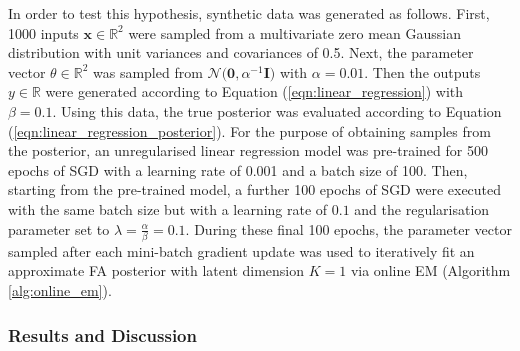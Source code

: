 \documentclass[msc,deptreport.inf]{infthesis} %
\newcommand{\matr}[1]{\mathbf{#1}}
\newcommand{\R}{\mathbb R}
\begin{document}
In order to test this hypothesis, synthetic data was generated as follows. First, 1000 inputs $\matr{x} \in \R^2$ were sampled from a multivariate zero mean Gaussian distribution with unit variances and covariances of 0.5. Next, the parameter vector $\theta \in \R^2$ was sampled from $\mathcal{N}\big(\matr{0}, \alpha^{-1} \matr{I} \big)$ with $\alpha = 0.01$. Then the outputs $y \in \R$ were generated according to Equation (\ref{eqn:linear_regression}) with $\beta = 0.1$. Using this data, the true posterior was evaluated according to Equation (\ref{eqn:linear_regression_posterior}). For the purpose of obtaining samples from the posterior, an unregularised linear regression model was pre-trained for 500 epochs of SGD with a learning rate of 0.001 and a batch size of 100. Then, starting from the pre-trained model, a further 100 epochs of SGD were executed with the same batch size but with a learning rate of $0.1$ and the regularisation parameter set to $\lambda = \frac{\alpha}{\beta} = 0.1$. During these final 100 epochs, the parameter vector sampled after each mini-batch gradient update was used to iteratively fit an approximate FA posterior with latent dimension $K=1$ via online EM (Algorithm \ref{alg:online_em}).


\subsubsection{Results and Discussion}
\end{document}

